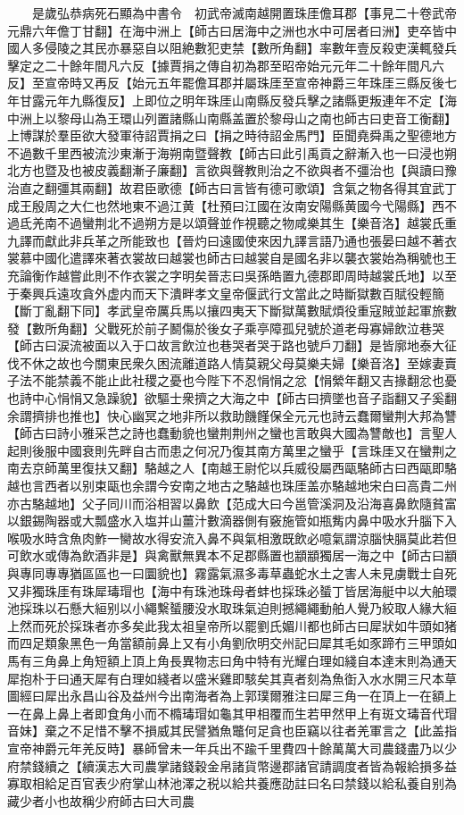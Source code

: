 　　是歲弘恭病死石顯為中書令　初武帝滅南越開置珠厓儋耳郡【事見二十卷武帝元鼎六年儋丁甘翻】在海中洲上【師古曰居海中之洲也水中可居者曰洲】吏卒皆中國人多侵陵之其民亦暴惡自以阻絶數犯吏禁【數所角翻】率數年壹反殺吏漢輒發兵擊定之二十餘年間凡六反【據賈捐之傳自初為郡至昭帝始元元年二十餘年間凡六反】至宣帝時又再反【始元五年罷儋耳郡并屬珠厓至宣帝神爵三年珠厓三縣反後七年甘露元年九縣復反】上即位之明年珠厓山南縣反發兵擊之諸縣更叛連年不定【海中洲上以黎母山為王環山列置諸縣山南縣盖置於黎母山之南也師古曰吏音工衡翻】上博謀於羣臣欲大發軍待詔賈捐之曰【捐之時待詔金馬門】臣聞堯舜禹之聖德地方不過數千里西被流沙東漸于海朔南暨聲教【師古曰此引禹貢之辭漸入也一曰浸也朔北方也暨及也被皮義翻漸子廉翻】言欲與聲教則治之不欲與者不彊治也【與讀曰豫治直之翻彊其兩翻】故君臣歌德【師古曰言皆有德可歌頌】含氣之物各得其宜武丁成王殷周之大仁也然地東不過江黄【杜預曰江國在汝南安陽縣黄國今弋陽縣】西不過氐羌南不過蠻荆北不過朔方是以頌聲並作視聽之物咸樂其生【樂音洛】越裳氏重九譯而獻此非兵革之所能致也【晉灼曰遠國使來因九譯言語乃通也張晏曰越不著衣裳慕中國化遣譯來著衣裳故曰越裳也師古曰越裳自是國名非以襲衣裳始為稱號也王充論衡作越嘗此則不作衣裳之字明矣晉志曰吳孫皓置九德郡即周時越裳氏地】以至于秦興兵遠攻貪外虚内而天下潰畔孝文皇帝偃武行文當此之時斷獄數百賦役輕簡【斷丁亂翻下同】孝武皇帝厲兵馬以攘四夷天下斷獄萬數賦煩役重寇賊並起軍旅數發【數所角翻】父戰死於前子鬭傷於後女子乘亭障孤兒號於道老母寡婦飲泣巷哭【師古曰涙流被面以入于口故言飲泣也巷哭者哭于路也號戶刀翻】是皆廓地泰大征伐不休之故也今關東民衆久困流離道路人情莫親父母莫樂夫婦【樂音洛】至嫁妻賣子法不能禁義不能止此社稷之憂也今陛下不忍悁悁之忿【悁縈年翻又吉掾翻忿也憂也詩中心悁悁又急躁貌】欲驅士衆擠之大海之中【師古曰擠墜也音子詣翻又子奚翻余謂擠排也推也】快心幽冥之地非所以救助饑饉保全元元也詩云蠢爾蠻荆大邦為讐【師古曰詩小雅采芑之詩也蠢動貌也蠻荆荆州之蠻也言敢與大國為讐敵也】言聖人起則後服中國衰則先畔自古而患之何况乃復其南方萬里之蠻乎【言珠厓又在蠻荆之南去京師萬里復扶又翻】駱越之人【南越王尉佗以兵威役屬西甌駱師古曰西甌即駱越也言西者以别束甌也余謂今安南之地古之駱越也珠厓盖亦駱越地宋白曰高貴二州亦古駱越地】父子同川而浴相習以鼻飲【范成大曰今邕管溪洞及沿海喜鼻飲隨貧富以銀錫陶器或大瓢盛水入塩并山薑汁數滴器側有竅施管如瓶觜内鼻中吸水升腦下入喉吸水時含魚肉鮓一臠故水得安流入鼻不與氣相激既飲必噫氣謂涼腦快膈莫此若但可飲水或傳為飲酒非是】與禽獸無異本不足郡縣置也顓顓獨居一海之中【師古曰顓與專同專專猶區區也一曰圜貌也】霧露氣濕多毒草蟲蛇水土之害人未見虜戰士自死又非獨珠厓有珠犀瑇瑁也【海中有珠池珠母者蚌也採珠必蜑丁皆居海艇中以大舶環池採珠以石懸大絙别以小繩繫蜑腰没水取珠氣迫則撼繩繩動舶人覺乃絞取人緣大絙上然而死於採珠者亦多矣此我太祖皇帝所以罷劉氏媚川都也師古曰犀狀如牛頭如猪而四足類象黑色一角當額前鼻上又有小角劉欣明交州記曰犀其毛如豕蹄冇三甲頭如馬有三角鼻上角短額上頂上角長異物志曰角中特有光耀白理如綫自本達末則為通天犀抱朴于曰通天犀有白理如綫者以盛米雞即駭矣其真者刻為魚衘入水水開三尺本草圖經曰犀出永昌山谷及益州今出南海者為上郭璞爾雅注曰犀三角一在頂上一在額上一在鼻上鼻上者即食角小而不橢瑇瑁如龜其甲相覆而生若甲然甲上有斑文瑇音代瑁音妹】棄之不足惜不擊不損威其民譬猶魚鼈何足貪也臣竊以往者羌軍言之【此盖指宣帝神爵元年羌反時】暴師曾未一年兵出不踰千里費四十餘萬萬大司農錢盡乃以少府禁錢續之【續漢志大司農掌諸錢穀金帛諸貨幣邊郡諸官請調度者皆為報給損多益寡取相給足百官表少府掌山林池澤之税以給共養應劭註曰名曰禁錢以給私養自别為藏少者小也故稱少府師古曰大司農